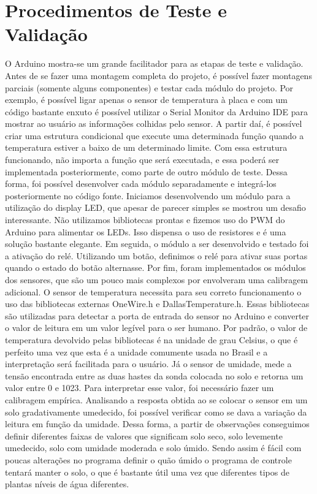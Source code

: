 \documentclass[a4paper,12pt]{article}
\begin{document}
\section{Procedimentos de Teste e Validação}

    O Arduino mostra-se um grande facilitador para as etapas de teste e validação. Antes de se fazer uma montagem completa do projeto, é possível fazer montagens parciais (somente alguns componentes) e testar cada módulo do projeto. Por exemplo, é possível ligar apenas o sensor de temperatura à placa e com um código bastante enxuto é possível utilizar o Serial Monitor da Arduino IDE para mostrar ao usuário as informações colhidas pelo sensor. A partir daí, é possível criar uma estrutura condicional que execute uma determinada função quando a temperatura estiver a baixo de um determinado limite. Com essa estrutura funcionando, não importa a função que será executada, e essa poderá ser implementada posteriormente, como parte de outro módulo de teste.
    Dessa forma, foi possível desenvolver cada módulo separadamente e integrá-los posteriormente no código fonte. Iniciamos desenvolvendo um módulo para a utilização do display LED, que apesar de parecer simples se mostrou um desafio interessante. Não utilizamos bibliotecas prontas e fizemos uso do PWM do Arduino para alimentar os LEDs. Isso dispensa o uso de resistores e é uma solução bastante elegante. Em seguida, o módulo a ser desenvolvido e testado foi a ativação do relé. Utilizando um botão, definimos o relé para ativar suas portas quando o estado do botão alternasse. Por fim, foram implementados os módulos dos sensores, que são um pouco mais complexos por envolveram uma  calibragem adicional.
    O sensor de temperatura necessita para seu correto funcionamento o uso das bibliotecas externas OneWire.h e DallasTemperature.h. Essas bibliotecas são utilizadas para detectar a porta de entrada do sensor no Arduino e converter o valor de leitura em um valor legível para o ser humano. Por padrão, o valor de temperatura devolvido pelas bibliotecas é na unidade de grau Celsius, o que é perfeito uma vez que esta é a unidade comumente usada no Brasil e a interpretação será facilitada para o usuário. Já o sensor de umidade, mede a tensão encontrada entre as duas hastes da sonda colocada no solo e retorna um valor entre 0 e 1023. Para interpretar esse valor, foi necessário fazer um calibragem empírica. Analisando a resposta obtida ao se colocar o sensor em um solo gradativamente umedecido, foi possível verificar como se dava a variação da leitura em função da umidade. Dessa forma, a partir de observações conseguimos definir diferentes faixas de valores que significam solo seco, solo levemente umedecido, solo com umidade moderada e solo úmido. Sendo assim é fácil com poucas alterações no programa definir o quão úmido o programa de controle tentará manter o solo, o que é bastante útil uma vez que diferentes tipos de plantas níveis de água diferentes.
\end{document}
